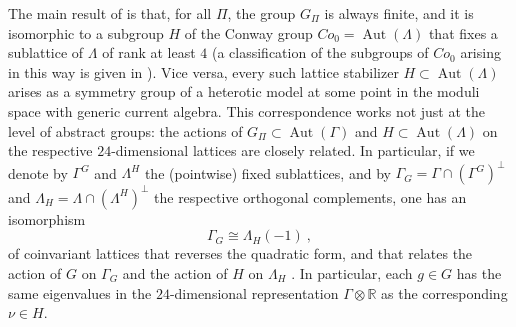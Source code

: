 \documentclass[11pt,reqno]{article}
\newcommand{\be}{\begin{equation}}
\newcommand{\ee}{\end{equation}}
\DeclareMathOperator{\Aut}{Aut}
\newcommand{\RR}{\mathbb{R}}
\begin{document}
The main result of \cite{Gaberdiel:2011fg} is that, for all $\Pi$, the group $G_\Pi$ is always finite, and it is isomorphic  to a subgroup $H$ of the Conway group $Co_0=\Aut(\Lambda)$ that fixes a sublattice of $\Lambda$ of rank at least $4$ (a classification of the subgroups of $Co_0$ arising in this way is given in \cite{HoehnMason2016}). Vice versa, every such lattice stabilizer $H\subset \Aut(\Lambda)$ arises as a symmetry group of a heterotic model at some point in the moduli space with generic current algebra. This correspondence works not just at the level of abstract groups: the actions of $G_\Pi \subset \Aut(\Gamma)$ and $H\subset \Aut(\Lambda)$ on the respective $24$-dimensional lattices are closely related. In particular, if we denote by $\Gamma^G$ and $\Lambda^H$ the (pointwise) fixed sublattices, and  by $\Gamma_G=\Gamma\cap (\Gamma^G)^\perp$ and $\Lambda_H=\Lambda\cap (\Lambda^H)^\perp$ the respective orthogonal complements, one has an isomorphism
\be \Gamma_G\cong \Lambda_H(-1)\ ,
\ee of coinvariant lattices that reverses the quadratic form, and that relates the action of $G$ on $\Gamma_G $ and the action of $H$ on $\Lambda_H$ \cite{Gaberdiel:2011fg}. In particular, each $g\in G$ has the same eigenvalues in the $24$-dimensional representation $\Gamma\otimes \RR$ as the corresponding $\nu \in H$.
\end{document}
